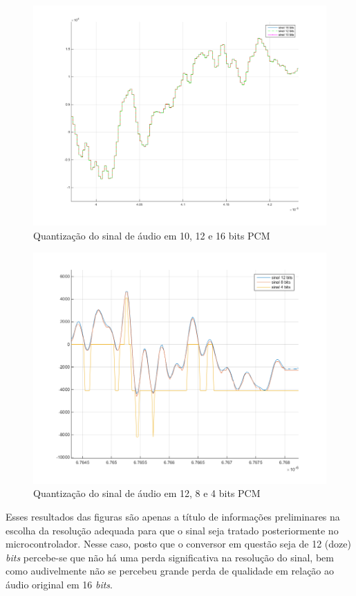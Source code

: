 		
		\begin{figure}[!ht]
			\label{fig-exp1}
			\centering
			\includegraphics[scale=0.5]{./figuras/simulacoes/resolucao-audios/10-12-16-normal.png}
			\caption{Quantização do sinal de áudio em 10, 12 e 16 bits PCM}
		\end{figure}
		
		\begin{figure}[!ht]
			\label{fig-exp2}
			\centering
			\includegraphics[scale=0.5]{./figuras/simulacoes/resolucao-audios/12-8-4-normal.png}
			\caption{Quantização do sinal de áudio em 12, 8 e 4 bits PCM}
		\end{figure}
	
		Esses resultados das figuras  são apenas a título de informações preliminares na escolha da resolução adequada para que o sinal seja tratado posteriormente no microcontrolador. Nesse caso, posto que o conversor em questão seja de 12 (doze) \textit{bits} percebe-se que não há uma perda significativa na resolução do sinal, bem como audivelmente não se percebeu grande perda de qualidade em relação ao áudio original em 16 \textit{bits}.
	
		
	
	

